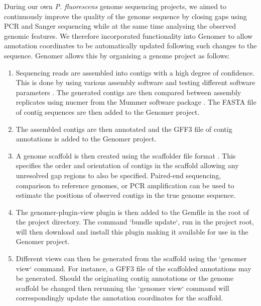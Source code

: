 \documentclass[10pt]{article}
\begin{document}
During our own \emph{P. fluorescens} genome sequencing projects, we aimed to
continuously improve the quality of the genome sequence by closing gaps using
PCR and Sanger sequencing while at the same time analysing the observed genomic
features. We therefore incorporated functionality into Genomer to allow
annotation coordinates to be automatically updated following such changes to
the sequence. Genomer allows this by organising a genome project as follows:

\begin{enumerate}

\item{Sequencing reads are assembled into contigs with a high degree of
confidence. This is done by using various assembly software and testing
different software parameters \cite{earl2011}. The generated contigs are then
compared between assembly replicates using nucmer from the Mummer software
package \cite{kurtz2004}. The FASTA file of contig sequences are then added to
the Genomer project.}

\item{The assembled contigs are then annotated and the GFF3 file of contig
annotations is added to the Genomer project.}

\item{A genome scaffold is then created using the scaffolder file format
\cite{barton2012}. This specifies the order and orientation of contigs in the
scaffold allowing any unresolved gap regions to also be specified. Paired-end
sequencing, comparison to reference genomes, or PCR amplification can be used
to estimate the positions of observed contigs in the true genome sequence.}
  
\item{The genomer-plugin-view plugin is then added to the Gemfile in the root
of the project directory. The command `bundle update`, run in the project root,
will then download and install this plugin making it available for use in the
Genomer project.}
  
\item{Different views can then be generated from the scaffold using the
`genomer view` command. For instance, a GFF3 file of the scaffolded annotations
may be generated. Should the originating contig annotations or the genome
scaffold be changed then rerunning the `genomer view` command will
correspondingly update the annotation coordinates for the scaffold.}

\end{enumerate}
  
\end{document}
